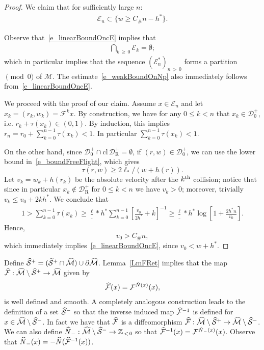 \documentclass[AHL, Unicode, longabstracts,published]{cedram}
\newcommand{\nin}{\not\in}
\newcommand{\ct}{r}
\newcommand{\fft}{\tau}
\newcommand{\cl}[1]{\mathrm{cl}\,#1}
\newcommand{\inv}{^{-1}}
\newcommand{\bZ}{\mathbb{Z}}
\newcommand{\cE}{\mathcal E}
\newcommand{\cEs}{\mathcal E^{*}}
\newcommand{\cm}{\mathcal{F}}
\newcommand{\cell}{\mathcal{D}}
\newcommand{\csp}{\mathcal{M}}
\newcommand{\cmp}{\hat\cm}
\newcommand{\cspi}{\widehat{\csp}}
\newcommand{\privateu}[1]{#1^*}
\newcommand{\privatel}[1]{#1_*}
\newcommand{\slope}{h}
\newcommand{\slopeu}{\privateu{\slope}}
\newcommand{\elll}{\privatel{\ell}}
\newcommand{\recoPrivate}{\mathrm{R}}
\newcommand{\backReco}{{\cell^+_{\recoPrivate}}}
\newcommand{\singPrivate}{\mathcal{S}}
\newcommand{\singp}[1]{\hat{\singPrivate}^{#1}}
\newcommand{\singt}[1]{\tilde{\singPrivate}^{#1}}
\newcommand{\Np}{\hat N}
\newcommand{\Const}{C_\#}
\let\oldtilde\tilde
\renewcommand*{\tilde}[1]{\mathchoice{\widetilde{#1}}{\widetilde{#1}}{\oldtilde{#1}}{\oldtilde{#1}}}
\let\oldhat\hat
\renewcommand*{\hat}[1]{\mathchoice{\widehat{#1}}{\widehat{#1}}{\oldhat{#1}}{\oldhat{#1}}}
\begin{document}
\begin{proof}
We claim that for sufficiently large $n$:
\begin{align}\label{e_linearBoundOncE}
\cE_n \subset \{w\ge \Const n-\slopeu\}.
\end{align}

Observe that~\eqref{e_linearBoundOncE} implies that
\begin{align*}
\bigcap_{k\,\ge\,0}\cE_k = \emptyset;
\end{align*}
which in particular implies that the sequence $(\cEs_n)_{n\,>\,0}$ forms a partition$\pmod 0$ of $\csp$. The estimate~\eqref{e_weakBoundOnNp} also immediately follows from~\eqref{e_linearBoundOncE}.

We proceed with the proof of our claim. Assume $x\in\cE_n$ and let $x_k =(r_k,w_k) = \cm^k x$. By construction, we have for any $0\le k < n$ that $x_k\in\cell^+_0$, i.e. $\ct_{k}+\fft(x_{k}) \in(0,1)$. By induction, this implies $\ct_n = \ct_{0}+\sum_{k=0}^{n-1}\fft(x_k) < 1$. In particular
$\sum_{k=0}^{n-1}\fft(x_k) < 1. $

On the other hand, since $\cell^+_0\cap\cl\backReco = \emptyset$, if $(r,w)\in\cell^+_0$, we can use the lower bound in~\eqref{e_boundFreeFlight}, which gives
\begin{equation}\label{FTRecall}
\fft(\ct,w)\geq2\elll/(w+h(\ct)).
\end{equation}
Let $v_k = w_k+h(\ct_{k})$ be the absolute velocity after the $k^{\rm th}$ collision; notice that since in particular $x_k\nin\backReco$ for $0\le k < n$ we have $v_k > 0$; moreover, trivially $v_k \le v_0+2k\slopeu$. We conclude that
\begin{align*}
1 > \sum_{k = 0}^{n-1}\fft(x_k)\ge \frac\elll\slopeu\sum_{k = 0}^{n-1}\left[\frac{v_0}{2\slopeu}+k\right]\inv\ge\frac\elll\slopeu\log\left[1+\frac{2\slopeu n}{v_0}\right].
\end{align*}
Hence,
\begin{equation}\label{ColBLV}
v_0 > \Const n,
\end{equation}
which immediately implies~\eqref{e_linearBoundOncE}, since $v_0 < w+\slopeu$.
\end{proof}

Define $\singp+ = (\singt+\cap\cspi) \cup \partial\cspi$. Lemma~\ref{LmFRet} implies that the map $\cmp:\cspi\setminus\singp+\to\cspi$ given by
\begin{align*}
\cmp(x) = \cm^{\Np(x)}(x),
\end{align*}
is well defined and smooth. A completely analogous construction leads to the definition of a set $\singp{-}$ so that the inverse induced map $\cmp\inv$ is defined for $x\in\cspi\setminus\singp-$. In fact we have that $\cmp$ is a diffeomorphism $\cmp:\cspi\setminus\singp+\to\cspi\setminus\singp-$. We can also define $\Np_{-}:\cspi\setminus\singp-\to\bZ_{\,<\,0}$ so that $\cmp\inv(x) = \cm^{\Np_{-}(x)}(x)$. Observe that $\Np_{-}(x) =-\Np(\cmp\inv(x))$.
\end{document}
